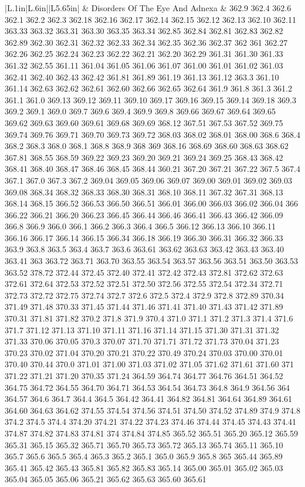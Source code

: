 \begin{longtable}{|L{.1in}|L{.6in}||L{5.65in}|}
   & Disorders Of The Eye And Adnexa &   362.9 362.4 362.6 362.1 362.2 362.3 362.18 362.16 362.17 362.14 362.15 362.12 362.13 362.10 362.11 363.33 363.32 363.31 363.30 363.35 363.34 362.85 362.84 362.81 362.83 362.82 362.89 362.30 362.31 362.32 362.33 362.34 362.35 362.36 362.37 362 361 362.27 362.26 362.25 362.24 362.23 362.22 362.21 362.20 362.29 361.31 361.30 361.33 361.32 362.55 361.11 361.04 361.05 361.06 361.07 361.00 361.01 361.02 361.03 362.41 362.40 362.43 362.42 361.81 361.89 361.19 361.13 361.12 363.3 361.10 361.14 362.63 362.62 362.61 362.60 362.66 362.65 362.64 361.9 361.8 361.3 361.2 361.1 361.0 369.13 369.12 369.11 369.10 369.17 369.16 369.15 369.14 369.18 369.3 369.2 369.1 369.0 369.7 369.6 369.4 369.9 369.8 369.66 369.67 369.64 369.65 369.62 369.63 369.60 369.61 369.68 369.69 368.12 367.51 367.53 367.52 369.75 369.74 369.76 369.71 369.70 369.73 369.72 368.03 368.02 368.01 368.00 368.6 368.4 368.2 368.3 368.0 368.1 368.8 368.9 368 369 368.16 368.69 368.60 368.63 368.62 367.81 368.55 368.59 369.22 369.23 369.20 369.21 369.24 369.25 368.43 368.42 368.41 368.40 368.47 368.46 368.45 368.44 360.21 367.20 367.21 367.22 367.5 367.4 367.1 367.0 367.3 367.2 369.04 369.05 369.06 369.07 369.00 369.01 369.02 369.03 369.08 368.34 368.32 368.33 368.30 368.31 368.10 368.11 367.32 367.31 368.13 368.14 368.15 366.52 366.53 366.50 366.51 366.01 366.00 366.03 366.02 366.04 366 366.22 366.21 366.20 366.23 366.45 366.44 366.46 366.41 366.43 366.42 366.09 366.8 366.9 366.0 366.1 366.2 366.3 366.4 366.5 366.12 366.13 366.10 366.11 366.16 366.17 366.14 366.15 366.34 366.18 366.19 366.30 366.31 366.32 366.33 363.9 363.8 363.5 363.4 363.7 363.6 363.61 363.62 363.63 363.42 363.43 363.40 363.41 363 363.72 363.71 363.70 363.55 363.54 363.57 363.56 363.51 363.50 363.53 363.52 378.72 372.44 372.45 372.40 372.41 372.42 372.43 372.81 372.62 372.63 372.61 372.64 372.53 372.52 372.51 372.50 372.56 372.55 372.54 372.34 372.71 372.73 372.72 372.75 372.74 372.7 372.6 372.5 372.4 372.9 372.8 372.89 370.34 371.49 371.48 370.33 371.45 371.44 371.46 371.41 371.40 371.43 371.42 371.89 370.31 371.81 371.82 370.2 371.8 371.9 370.4 371.0 371.1 371.2 371.3 371.4 371.6 371.7 371.12 371.13 371.10 371.11 371.16 371.14 371.15 371.30 371.31 371.32 371.33 370.06 370.05 370.3 370.07 371.70 371.71 371.72 371.73 370.04 371.23 370.23 370.02 371.04 370.20 370.21 370.22 370.49 370.24 370.03 370.00 370.01 370.40 370.44 370.0 371.01 371.00 371.03 371.02 371.05 371.62 371.61 371.60 371 371.22 371.21 371.20 370.35 371.24 364.59 364.74 364.77 364.76 364.51 364.52 364.75 364.72 364.55 364.70 364.71 364.53 364.54 364.73 364.8 364.9 364.56 364 364.57 364.6 364.7 364.4 364.5 364.42 364.41 364.82 364.81 364.64 364.89 364.61 364.60 364.63 364.62 374.55 374.54 374.56 374.51 374.50 374.52 374.89 374.9 374.8 374.2 374.5 374.4 374.20 374.21 374.22 374.23 374.46 374.44 374.45 374.43 374.41 374.87 374.82 374.83 374.81 374 374.84 374.85 365.52 365.51 365.20 365.12 365.59 365.31 365.15 365.32 365.71 365.70 365.73 365.72 365.13 365.74 365.11 365.10 365.7 365.6 365.5 365.4 365.3 365.2 365.1 365.0 365.9 365.8 365 365.44 365.89 365.41 365.42 365.43 365.81 365.82 365.83 365.14 365.00 365.01 365.02 365.03 365.04 365.05 365.06 365.21 365.62 365.63 365.60 365.61 
\end{longtable}
